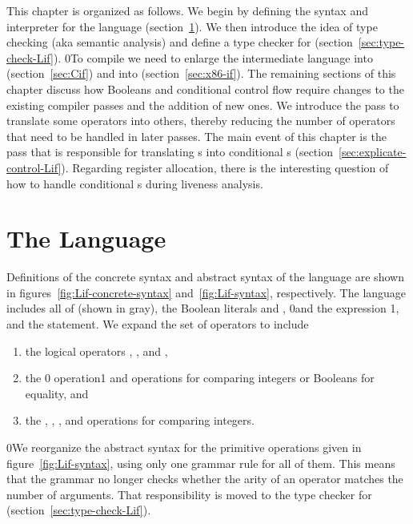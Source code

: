 \documentclass[7x10]{TimesAPriori_MIT}%
\def\racketEd{0}
\def\pythonEd{1}
\def\edition{1}
\newcommand{\racket}[1]{{\if\edition\racketEd{#1}\fi}}
\newcommand{\pythonColor}[0]{}
\newcommand{\python}[1]{{\if\edition\pythonEd\pythonColor #1\fi}}
\numberwithin{theorem}{chapter}
\numberwithin{definition}{chapter}
\numberwithin{equation}{chapter}
\begin{document}
This chapter is organized as follows.  We begin by defining the syntax
and interpreter for the \LangIf{} language
(section~\ref{sec:lang-if}). We then introduce the idea of type
checking (aka semantic analysis)
and define a type checker for \LangIf{}
(section~\ref{sec:type-check-Lif}).
%
\racket{To compile \LangIf{} we need to enlarge the intermediate
  language \LangCVar{} into \LangCIf{} (section~\ref{sec:Cif}) and
  \LangXInt{} into \LangXIf{} (section~\ref{sec:x86-if}).}
%
The remaining sections of this chapter discuss how Booleans and
conditional control flow require changes to the existing compiler
passes and the addition of new ones. We introduce the 
pass to translate some operators into others, thereby reducing the
number of operators that need to be handled in later passes.
%
The main event of this chapter is the  pass
that is responsible for translating s into conditional
s (section~\ref{sec:explicate-control-Lif}).
%
Regarding register allocation, there is the interesting question of
how to handle conditional s during liveness analysis.


\section{The \LangIf{} Language}
\label{sec:lang-if}

Definitions of the concrete syntax and abstract syntax of the
\LangIf{} language are shown in figures~\ref{fig:Lif-concrete-syntax}
and~\ref{fig:Lif-syntax}, respectively. The \LangIf{} language
includes all of \LangVar{} {(shown in gray)}, the Boolean
literals
\TRUE{} and \FALSE{}, \racket{and} the  expression%
\python{, and the \code{if} statement}. We expand the set of
operators to include
\begin{enumerate}
\item the logical operators , , and ,
\item the \racket{ operation}\python{\key{==} and \key{!=} operations}
  for comparing integers or Booleans for equality, and
\item the \key{<}, \key{<=},
  \key{>}, and
  \key{>=} operations for
  comparing integers.
\end{enumerate}

\racket{We reorganize the abstract syntax for the primitive
  operations given in figure~\ref{fig:Lif-syntax}, using only one grammar
  rule for all of them. This means that the grammar no longer checks
  whether the arity of an operator matches the number of
  arguments. That responsibility is moved to the type checker for
  \LangIf{} (section~\ref{sec:type-check-Lif}).}
\end{document}
